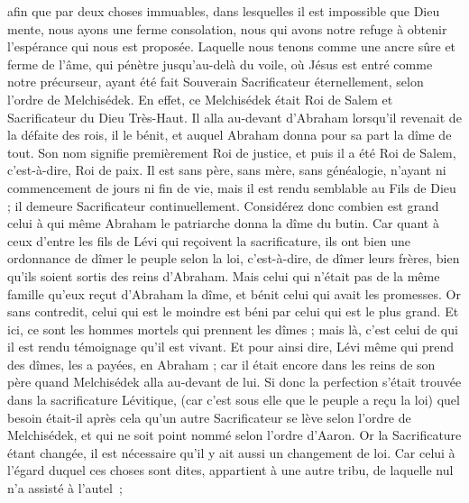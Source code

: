 \begin{multicols}{2}
afin que par deux choses immuables, dans lesquelles il est impossible que Dieu mente, nous ayons une ferme consolation, nous qui avons notre refuge à obtenir l’espérance qui nous est proposée.
Laquelle nous tenons comme une ancre sûre et ferme de l'âme, qui pénètre jusqu'au-delà du voile,
où Jésus est entré comme notre précurseur, ayant été fait Souverain Sacrificateur éternellement, selon l'ordre de Melchisédek.
\VerseOne{}En effet, ce Melchisédek était Roi de Salem et Sacrificateur du Dieu Très-Haut. Il alla au-devant d'Abraham lorsqu'il revenait de la défaite des rois, il le bénit,
et auquel Abraham donna pour sa part la dîme de tout. Son nom signifie premièrement Roi de justice, et puis il a été Roi de Salem, c’est-à-dire, Roi de paix.
Il est sans père, sans mère, sans généalogie, n'ayant ni commencement de jours ni fin de vie, mais il est rendu semblable au Fils de Dieu ; il demeure Sacrificateur continuellement.
Considérez donc combien est grand celui à qui même Abraham le patriarche donna la dîme du butin.
Car quant à ceux d'entre les fils de Lévi qui reçoivent la sacrificature, ils ont bien une ordonnance de dîmer le peuple selon la loi, c’est-à-dire, de dîmer leurs frères, bien qu’ils soient sortis des reins d’Abraham.
Mais celui qui n’était pas de la même famille qu’eux reçut d’Abraham la dîme, et bénit celui qui avait les promesses.
Or sans contredit, celui qui est le moindre est béni par celui qui est le plus grand.
Et ici, ce sont les hommes mortels qui prennent les dîmes ; mais là, c’est celui de qui il est rendu témoignage qu’il est vivant.
Et pour ainsi dire, Lévi même qui prend des dîmes, les a payées, en Abraham ;
car il était encore dans les reins de son père quand Melchisédek alla au-devant de lui.
Si donc la perfection s’était trouvée dans la sacrificature Lévitique, (car c’est sous elle que le peuple a reçu la loi) quel besoin était-il après cela qu’un autre Sacrificateur se lève selon l’ordre de Melchisédek, et qui ne soit point nommé selon l’ordre d’Aaron.
Or la Sacrificature étant changée, il est nécessaire qu’il y ait aussi un changement de loi.
Car celui à l’égard duquel ces choses sont dites, appartient à une autre tribu, de laquelle nul n’a assisté à l’autel ;

\end{multicols}
